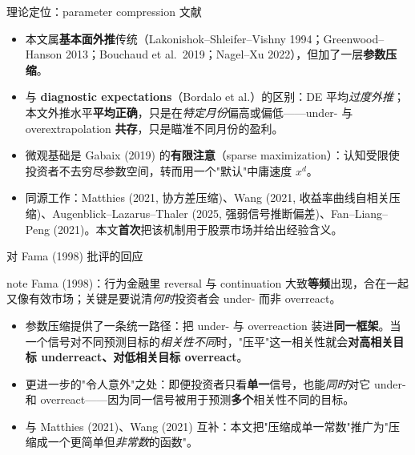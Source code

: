 \documentclass[aspectratio=169,10pt]{beamer}
\begin{document}
\begin{frame}{理论定位：parameter compression 文献}
	\begin{itemize}
		\item 本文属\textbf{基本面外推}传统（Lakonishok--Shleifer--Vishny 1994；Greenwood--Hanson 2013；Bouchaud et al.\ 2019；Nagel--Xu 2022），但加了一层\textbf{参数压缩}。
		\item 与 \textbf{diagnostic expectations}（Bordalo et al.）的区别：DE 平均\emph{过度外推}；本文外推水平\textbf{平均正确}，只是在\emph{特定月份}偏高或偏低——under- 与 overextrapolation \textbf{共存}，只是瞄准不同月份的盈利。
		\item 微观基础是 Gabaix (2019) 的\textbf{有限注意}（sparse maximization）：认知受限使投资者不去穷尽参数空间，转而用一个"默认"中庸速度 $x^d$。
		\item 同源工作：Matthies (2021, 协方差压缩)、Wang (2021, 收益率曲线自相关压缩)、Augenblick--Lazarus--Thaler (2025, 强弱信号推断偏差)、Fan--Liang--Peng (2021)。本文\textbf{首次}把该机制用于股票市场并给出经验含义。
	\end{itemize}
\end{frame}

\begin{frame}{对 Fama (1998) 批评的回应}
	\begin{beamercolorbox}[sep=0.5em,wd=\linewidth,rounded=true]{note}
		Fama (1998)：行为金融里 reversal 与 continuation 大致\textbf{等频}出现，合在一起又像有效市场；关键是要说清\emph{何时}投资者会 under- 而非 overreact。
	\end{beamercolorbox}
	\vspace{4pt}
	\begin{itemize}
		\item 参数压缩提供了一条统一路径：把 under- 与 overreaction 装进\textbf{同一框架}。当一个信号对不同预测目标的\emph{相关性不同}时，"压平"这一相关性就会\textbf{对高相关目标 underreact、对低相关目标 overreact}。
		\item 更进一步的"令人意外"之处：即便投资者只看\textbf{单一}信号，也能\emph{同时}对它 under- 和 overreact——因为同一信号被用于预测\textbf{多个}相关性不同的目标。
		\item 与 Matthies (2021)、Wang (2021) 互补：本文把"压缩成单一常数"推广为"压缩成一个更简单但\emph{非常数}的函数"。
	\end{itemize}
\end{frame}
\end{document}

